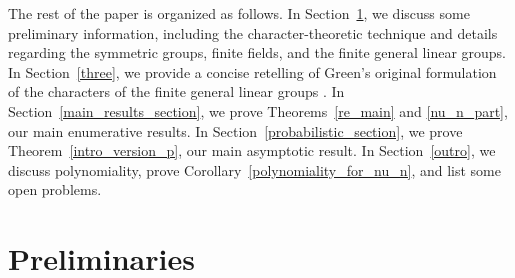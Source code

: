 \documentclass[Unicode,ALCO]{cedram}
\begin{document}
The rest of the paper is organized as follows.
In Section~\ref{two}, we discuss some preliminary information, including the character-theoretic technique and details regarding the symmetric groups, finite fields, and the finite general linear groups.
In Section~\ref{three}, we provide a concise retelling of Green's original formulation of the characters of the finite general linear groups \cite{green}.
In Section~\ref{main_results_section}, we prove Theorems~\ref{re_main} and \ref{nu_n_part}, our main enumerative results.
In Section~\ref{probabilistic_section}, we prove Theorem~\ref{intro_version_p}, our main asymptotic result.
In Section~\ref{outro}, we discuss polynomiality, prove Corollary~\ref{polynomiality_for_nu_n}, and list some open problems.




































\section{Preliminaries}
\label{two}
\end{document}
